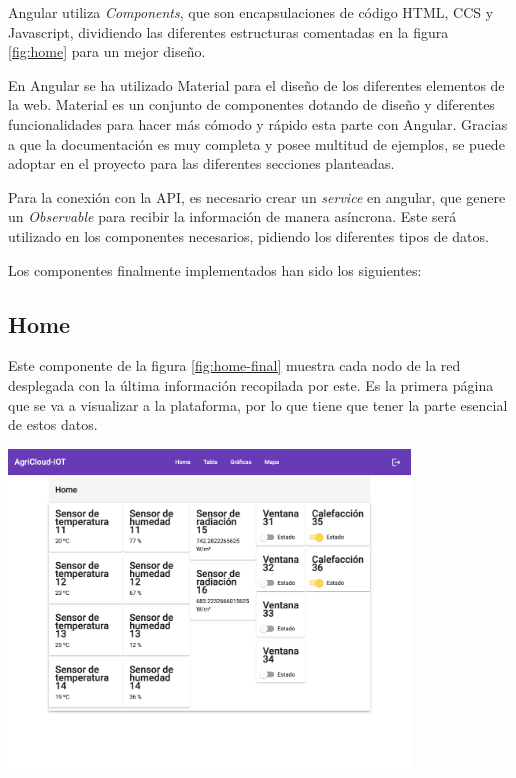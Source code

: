 Angular utiliza \textit{Components}, que son encapsulaciones de código HTML, CCS y Javascript, dividiendo las diferentes estructuras comentadas en la figura \ref{fig:home} para un mejor diseño.

En Angular se ha utilizado Material \cite{material-angular} para el diseño de los diferentes elementos de la web. Material es un conjunto de componentes dotando de diseño y diferentes funcionalidades para hacer más cómodo y rápido esta parte con Angular. Gracias a que la documentación es muy completa y posee multitud de ejemplos, se puede adoptar en el proyecto para las diferentes secciones planteadas.

Para la conexión con la API, es necesario crear un \textit{service} en angular, que genere un \textit{Observable} para recibir la información de manera asíncrona. Este será utilizado en los componentes necesarios, pidiendo los diferentes tipos de datos.

Los componentes finalmente implementados han sido los siguientes:

\subsection{Home}

Este componente de la figura \ref{fig:home-final} muestra cada nodo de la red desplegada con la última información recopilada por este. Es la primera página que se va a visualizar a la plataforma, por lo que tiene que tener la parte esencial de estos datos.


\begin{center}
    \centering
    \includegraphics[width=0.8\textwidth]{img/06-Web-home.png}
    \label{fig:home-final}
\end{center}

